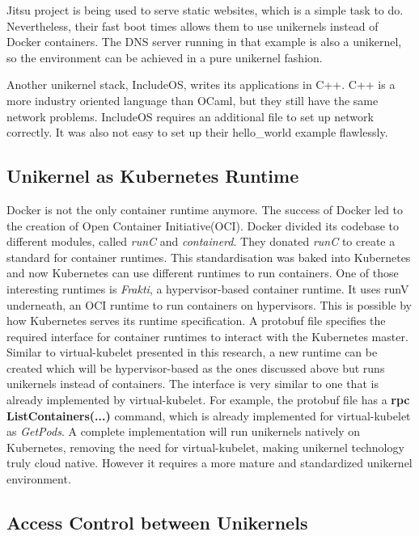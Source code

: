 Jitsu project is being used to serve static websites, which is a simple task to do. Nevertheless, their fast boot times allows them to use unikernels instead of Docker containers. The DNS server running in that example is also a unikernel, so the environment can be achieved in a pure unikernel fashion.

Another unikernel stack, IncludeOS, writes its applications in C++. C++ is a more industry oriented language than OCaml, but they still have the same network problems. IncludeOS requires an additional file to set up network correctly. It was also not easy to set up their hello\_world example flawlessly.
\pagebreak
\subsection{Unikernel as Kubernetes Runtime}

Docker is not the only container runtime anymore. The success of Docker led to the creation of Open Container Initiative(OCI). Docker divided its codebase to different modules, called \textit{runC} and \textit{containerd}. They donated \textit{runC} to create a standard for container runtimes. This standardisation was baked into Kubernetes and now Kubernetes can use different runtimes to run containers. One of those interesting runtimes is \textit{Frakti}, a hypervisor-based container runtime. It uses runV underneath, an OCI runtime to run containers on hypervisors. This is possible by how Kubernetes serves its runtime specification. A protobuf file \cite{protobuf} specifies the required interface for container runtimes to interact with the Kubernetes master. Similar to virtual-kubelet presented in this research, a new runtime can be created which will be hypervisor-based as the ones discussed above but runs unikernels instead of containers. The interface is very similar to one that is already implemented by virtual-kubelet. For example, the protobuf file has a \textbf{rpc ListContainers(...)} command, which is already implemented for virtual-kubelet as \textit{GetPods}. A complete implementation will run unikernels natively on Kubernetes, removing the need for virtual-kubelet, making unikernel technology truly cloud native. However it requires a more mature and standardized unikernel environment.

\subsection{Access Control between Unikernels}

